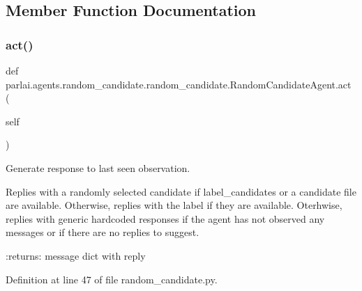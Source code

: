 \subsection{Member Function Documentation}
\mbox{\label{classparlai_1_1agents_1_1random__candidate_1_1random__candidate_1_1RandomCandidateAgent_acb0a6e3c223f9e784a668d24b3e7fc82}} 
\subsubsection{\texorpdfstring{act()}{act()}}
{\footnotesize\ttfamily def parlai.\+agents.\+random\+\_\+candidate.\+random\+\_\+candidate.\+Random\+Candidate\+Agent.\+act (\begin{DoxyParamCaption}\item[{}]{self }\end{DoxyParamCaption})}

\begin{DoxyVerb}Generate response to last seen observation.

Replies with a randomly selected candidate if label_candidates or a
candidate file are available.
Otherwise, replies with the label if they are available.
Oterhwise, replies with generic hardcoded responses if the agent has
not observed any messages or if there are no replies to suggest.

:returns: message dict with reply
\end{DoxyVerb}
 

Definition at line 47 of file random\+\_\+candidate.\+py.


